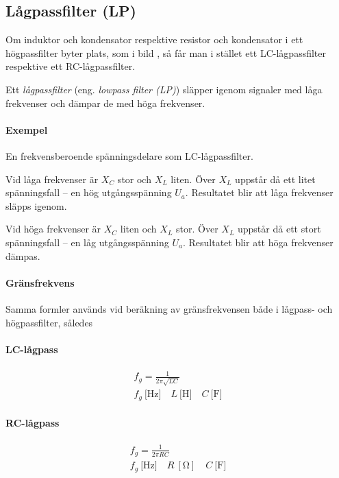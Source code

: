 \subsection{Lågpassfilter (LP)}
\label{lågpassfilter}


Om induktor och kondensator respektive resistor och kondensator i ett
högpassfilter byter plats, som i bild , så får man i
stället ett LC-lågpassfilter respektive ett RC-lågpassfilter.

Ett \emph{lågpassfilter} (eng. \emph{lowpass filter (LP)}) släpper igenom
signaler med låga frekvenser och dämpar de med höga frekvenser.

\paragraph{Exempel} En frekvensberoende spänningsdelare som LC-lågpassfilter.

Vid låga frekvenser är \(X_C\) stor och \(X_L\) liten.
Över \(X_L\) uppstår då ett litet spänningsfall -- en hög utgångsspänning
\(U_a\).
Resultatet blir att låga frekvenser släpps igenom.

Vid höga frekvenser är \(X_C\) liten och \(X_L\) stor.
Över \(X_L\) uppstår då ett stort spänningsfall -- en låg utgångsspänning
\(U_a\).
Resultatet blir att höga frekvenser dämpas.

\paragraph{Gränsfrekvens}

Samma formler används vid beräkning av gränsfrekvensen både i lågpass- och
högpassfilter, således

\paragraph{LC-lågpass}
\begin{gather*}
  f_g = \frac{1}{2\pi \sqrt{LC}} \\
  f_g\ \text{[Hz]} \quad L\ \text{[H]} \quad C\ \text{[F]}
\end{gather*}

\paragraph{RC-lågpass}
\begin{gather*}
  f_g = \frac{1}{2\pi {RC}} \\
  f_g\ \text{[Hz]} \quad R\ [\si{\ohm}] \quad C\ \text{[F]}
\end{gather*}

